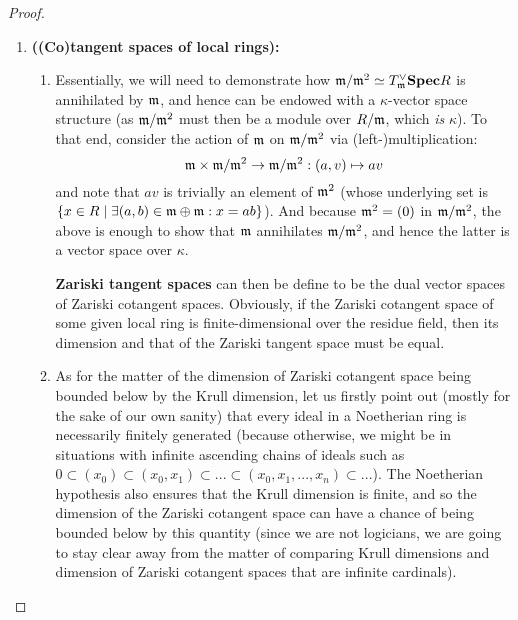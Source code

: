                 \begin{proof}
                    \noindent
                    \begin{enumerate}
                        \item \textbf{\textbf{((Co)tangent spaces of local rings):}} 
                            \begin{enumerate}
                                \item Essentially, we will need to demonstrate how $\mathfrak{m}/\mathfrak{m}^2 \simeq T^{\vee}_{\mathfrak{m}}\mathbf{Spec} R$ is annihilated by $\mathfrak{m}$, and hence can be endowed with a $\kappa$-vector space structure (as $\mathfrak{m}/\mathfrak{m}^2$ must then be a module over $R/\mathfrak{m}$, which \textit{is} $\kappa$). To that end, consider the action of $\mathfrak{m}$ on $\mathfrak{m}/\mathfrak{m}^2$ via (left-)multiplication:
                                    $$\m \x \m/\m^2 \to \m/\m^2: (a, v) \mapsto av$$
                                and note that $av$ is trivially an element of $\mathfrak{m}^2$ (whose underlying set is $\{x \in R \mid \exists (a, b) \in \mathfrak{m} \oplus \mathfrak{m}: x = ab\}$). And because $\mathfrak{m}^2 = (0)$ in $\mathfrak{m}/\mathfrak{m}^2$, the above is enough to show that $\mathfrak{m}$ annihilates $\mathfrak{m}/\mathfrak{m}^2$, and hence the latter is a vector space over $\kappa$. 
                                
                                \textbf{Zariski tangent spaces} can then be define to be the dual vector spaces of Zariski cotangent spaces. Obviously, if the Zariski cotangent space of some given local ring is finite-dimensional over the residue field, then its dimension and that of the Zariski tangent space must be equal.
                                
                                \item As for the matter of the dimension of Zariski cotangent space being bounded below by the Krull dimension, let us firstly point out (mostly for the sake of our own sanity) that every ideal in a Noetherian ring is necessarily finitely generated (because otherwise, we might be in situations with infinite ascending chains of ideals such as $0 \subset (x_0) \subset (x_0, x_1) \subset ... \subset (x_0, x_1, ..., x_n) \subset ...$). The Noetherian hypothesis also ensures that the Krull dimension is finite, and so the dimension of the Zariski cotangent space can have a chance of being bounded below by this quantity (since we are not logicians, we are going to stay clear away from the matter of comparing Krull dimensions and dimension of Zariski cotangent spaces that are infinite cardinals).
                                

\end{enumerate}
\end{enumerate}
\end{proof}
